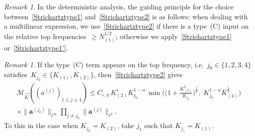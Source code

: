 \documentclass[11pt,reqno,english]{amsart}
\numberwithin{equation}{section}
\theoremstyle{plain}
\theoremstyle{definition}
\theoremstyle{remark}
\newtheorem{remark}[theorem]{Remark}
\begin{document}
\begin{remark}
	In the deterministic analysis, the guiding principle for the choice between~\eqref{Strichartztype1} and~\eqref{Strichartztype2} is as follows: when dealing with a multilinear expression, we use~\eqref{Strichartztype2} if there is a type~(C) input on the relative top frequencies~$\geq N_{(1)}^{1/2}$; otherwise we apply~\eqref{Strichartztype1} or~\eqref{Strichartztype1'}.
\end{remark}

\begin{remark}
	If the type~(C) term appears on the top frequency, i.e.\ $j_0\in\{1,2,3,4\}$ satisfies~$K_{j_0}\in\{K_{(1)},K_{(2)}\}$, then~\eqref{Strichartztype2} gives
	\begin{multline}
		\label{Strichartztype2'}
		\mathcal{M}_{\vec{K}}((a^{(j)})_{1\leq j\leq 4})
		\leq C_{\varepsilon,\eta}\,
		K_{(2)}^{\varepsilon}K_{j_0}^{1-\alpha} \,
		\min\Big(\Big(1+\frac{K_{(3)}^{2}}{K_{j_0}}\Big)^\frac12,\; K_{j_0}^{1-\alpha}K_{(4)}^\frac12\Big)
		\\
		\times
		\|\mathbf{a}^{(j_0)}\|_{\ell^{\infty}}\prod_{j\neq j_0}\|\mathbf{a}^{(j)}\|_{\ell^{2}}.
	\end{multline}
	To this in the case when $K_{j_0}=K_{(2)}$, take $j_1$ such that $K_{j_1}=K_{(1)}$.
\end{remark}
\end{document}
